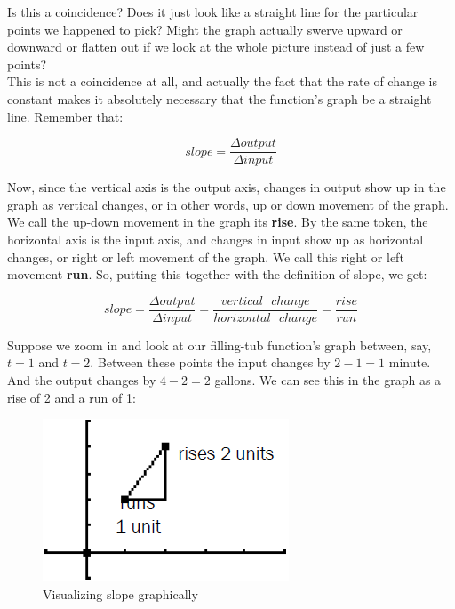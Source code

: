 Is this a coincidence? Does it just look like a straight line for the particular points we happened to pick? Might the graph actually swerve upward or downward or flatten out if we look at the whole picture instead of just a few points?\\

This is not a coincidence at all, and actually the fact that the rate of change is constant makes it absolutely necessary that the function’s graph be a straight line. Remember that:

\begin{equation*}
	slope = \frac{\Delta output}{\Delta input}
\end{equation*}

Now, since the vertical axis is the output axis, changes in output show up in the graph as vertical changes, or in other words, up or down movement of the graph. We call the up-down movement in the graph its \textbf{rise}. By the same token, the horizontal axis is the input axis, and changes in input show up as horizontal changes, or right or left movement of the graph. We call this right or left movement \textbf{run}. So, putting this together with the definition of slope, we get:

\begin{equation*}
	slope = \frac{\Delta output}{\Delta input}=\frac{vertical \text{ } change}{horizontal \text{ } change} = \frac{rise}{run}
\end{equation*}

Suppose we zoom in and look at our filling-tub function’s graph between, say, $t=1$ and $t=2$.  Between these points the input changes by $2-1=1$ minute. And the output changes by $4-2=2$ gallons. We can see this in the graph as a rise of 2 and a run of 1:

\begin{figure}[H]
	\centering
	\includegraphics[scale=1.0]{Sections/LinearFunctionsandSlopeImages/Figure02.png}
	\caption{Visualizing slope graphically}
\end{figure}

